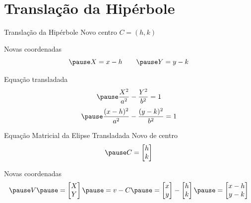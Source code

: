 \documentclass[fleqn,aspectratio=169,12pt]{beamer}
\begin{document}


\section{Translação da Hipérbole}

\begin{frame}{Translação da Hipérbole}
  Novo centro \(C = (h, k)\)

  \pause
  Novas coordenadas
  \[
    \pause
    X = x - h
    \qquad
    \pause
    Y = y - k
  \]

  \pause
  Equação transladada
  \[
    \pause
    \frac{X^2}{a^2} - \frac{Y^2}{b^2} = 1
  \]
  \[
    \pause
    \frac{(x-h)^2}{a^2} - \frac{(y-k)^2}{b^2} = 1
  \]
\end{frame}

\begin{proofframe}{Equação Matricial da Elipse Transladada}
  Novo de centro
  \[
    \pause
    C
    = \begin{bmatrix}
      h \\
      k
    \end{bmatrix}
  \]

  \pause
  \bigskip
  Novas coordenadas
  \[
    \pause
    V
    \pause
    = \begin{bmatrix}
      X \\
      Y
    \end{bmatrix}
    \pause
    = v - C
    \pause
    = \begin{bmatrix}
      x \\
      y
    \end{bmatrix}
    -
    \begin{bmatrix}
      h \\
      k
    \end{bmatrix}
    \pause
    = \begin{bmatrix}
      x - h \\
      y - k
    \end{bmatrix}
  \]
\end{proofframe}
\end{document}
